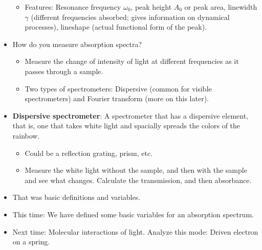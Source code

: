\documentclass[../notes.tex]{subfiles}
\begin{document}
\begin{itemize}
\begin{itemize}
        \item Features: Resonance frequency $\omega_0$, peak height $A_0$ or peak area, linewidth $\gamma$ (different frequencies absorbed; gives information on dynamical processes), lineshape (actual functional form of the peak).
    \end{itemize}
    \item How do you measure absorption spectra?
    \begin{itemize}
        \item Measure the change of intensity of light at different frequencies as it passes through a sample.
        \item Two types of spectrometers: Dispersive (common for visible spectrometers) and Fourier transform (more on this later).
    \end{itemize}
    \item \textbf{Dispersive spectrometer}: A spectrometer that has a dispersive element, that is, one that takes white light and spacially spreads the colors of the rainbow.
    \begin{itemize}
        \item Could be a reflection grating, prism, etc.
        \item Measure the white light without the sample, and then with the sample and see what changes. Calculate the transmission, and then absorbance.
    \end{itemize}
    \item That was basic definitions and variables.
    \item This time: We have defined some basic variables for an absorption spectrum.
    \item Next time: Molecular interactions of light. Analyze this mode: Driven electron on a spring.
\end{itemize}
\end{document}

